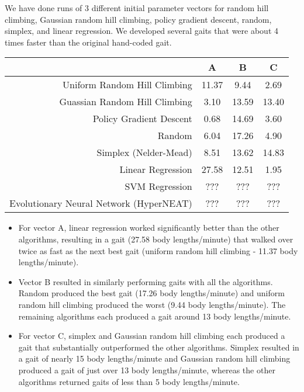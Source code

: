 We have done runs of 
3 different initial parameter vectors for random hill climbing, 
Gaussian random hill climbing, policy gradient descent, random,
simplex, and linear regression. We developed several
gaits that were about 4 times faster than the original hand-coded gait. 



\begin{tabular}{|r|c|c|c|}
\hline
                                         & A       & B      & C      \\
\hline
Uniform Random Hill Climbing             & 11.37   & 9.44   & 2.69   \\
\hline
Guassian Random Hill Climbing            & 3.10    & 13.59  & 13.40  \\
\hline
Policy Gradient Descent                  & 0.68    & 14.69  & 3.60   \\
\hline
Random                                   & 6.04    & 17.26  & 4.90   \\
\hline
Simplex (Nelder-Mead)                    & 8.51    & 13.62  & 14.83  \\
\hline
Linear Regression                        & 27.58   & 12.51  & 1.95   \\
\hline
SVM Regression                           & ???     & ???    & ???    \\
\hline
Evolutionary Neural Network (HyperNEAT)  & ???     & ???    & ???    \\
\hline
\end{tabular}



\begin{itemize}

\item For vector A, linear regression worked significantly better than the other algorithms, resulting in a gait (27.58 body lengths/minute) that walked over twice as fast as the next best gait (uniform random hill climbing - 11.37 body lengths/minute).

\item Vector B resulted in similarly performing gaits with all the algorithms. Random produced the best gait (17.26 body lengths/minute) and uniform random hill climbing produced the worst (9.44 body lengths/minute). The remaining algorithms each produced a gait around 13 body lengths/minute.

\item For vector C, simplex and Gaussian random hill climbing each produced a gait that substantially outperformed the other algorithms. Simplex resulted in a gait of nearly 15 body lengths/minute  and Gaussian random hill climbing produced a gait of just over 13 body lengths/minute, whereas the other algorithms returned gaits of less than 5 body lengths/minute.

\end{itemize}

